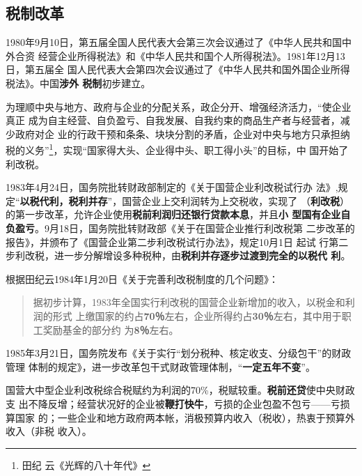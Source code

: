 \subsection{税制改革}

1980年9月10日，第五届全国人民代表大会第三次会议通过了《中华人民共和国中外合资
经营企业所得税法》和《中华人民共和国个人所得税法》。1981年12月13日，第五届全
国人民代表大会第四次会议通过了《中华人民共和国外国企业所得税法》。中国\textbf{涉外
  税制}初步建立。

为理顺中央与地方、政府与企业的分配关系，政企分开、增强经济活力，“使企业真正
成为自主经营、自负盈亏、自我发展、自我约束的商品生产者与经营者，减少政府对企
业的行政干预和条条、块块分割的矛盾，企业对中央与地方只承担纳税的义务”\footnote{田纪
  云《光辉的八十年代》}，实现“国家得大头、企业得中头、职工得小头”的目标，中
国开始了利改税。

1983年4月24日，国务院批转财政部制定的《关于国营企业利改税试行办
法》,规定“\textbf{以税代利，税利并存}”，国营企业上交利润转为上交税收，实现了
（\textbf{利改税}）的第一步改革，允许企业使用\textbf{税前利润归还银行贷款本息}，并且\textbf{小
  型国有企业自负盈亏}。9月18日，国务院批转财政部《关于在国营企业推行利改税第
二步改革的报告》，并颁布了《国营企业第二步利改税试行办法》，规定10月1日 起试
行第二步利改税，进一步分解增设多种税种，由\textbf{税利并存逐步过渡到完全的以税代
  利}。

根据田纪云1984年1月20日《关于完善利改税制度的几个问题》：
\begin{quotation}
  据初步计算，1983年全国实行利改税的国营企业新增加的收入，以税金和利润的形式
  上缴国家的约占\textbf{70％}左右，企业所得约占\textbf{30％}左右，其中用于职工奖励基金的部分约
  为\textbf{8％}左右。

\end{quotation}



1985年3月21日，国务院发布《关于实行“划分税种、核定收支、分级包干”的财政管理
体制的规定》，进一步改革包干式财政管理体制，“\textbf{一定五年不变}”。

国营大中型企业利改税综合税赋约为利润的70\%，税赋较重。\textbf{税前还贷}使中央财政支
出不降反增；经营状况好的企业被\textbf{鞭打快牛}，亏损的企业包盈不包亏——亏损算国家
的；一些企业和地方政府两本帐，消极预算内收入（税收），热衷于预算外收入（非税
收入）。


